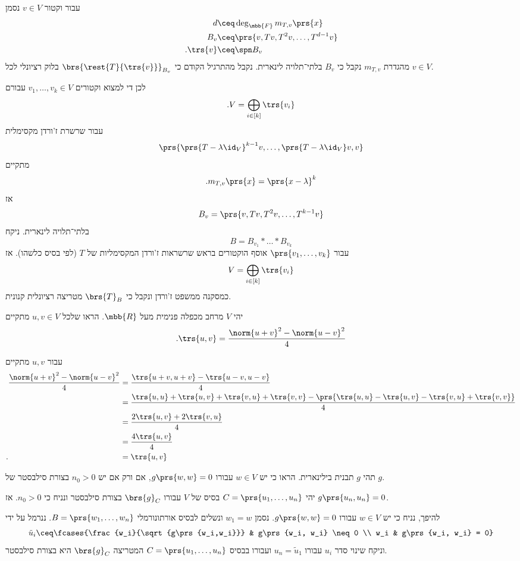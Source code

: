 \documentclass[a4paper,10pt,oneside,openany]{article}
\begin{document}
\begin{solution}
עבור וקטור
$v \in V$
נסמן
\begin{align*}
d &\ceq \deg_{\mbb{F}} m_{T,v}\prs{x} \\
B_v &\ceq \prs{v, Tv, T^2 v, \ldots, T^{d-1} v} \\
\text{.} \trs{v} &\ceq \spn B_v
\end{align*}
מהגדרת
$m_{T,v}$
נקבל כי
$B_v$
בלתי־תלויה לינארית.
נקבל מהתרגיל הקודם כי
$\brs{\rest{T}{\trs{v}}}_{B_v}$
בלוק רציונלי לכל
$v \in V$.

לכן די למצוא וקטורים
$v_1, \ldots, v_k \in V$
עבורם
\[\text{.} V = \bigoplus_{i \in [k]} \trs{v_i}\]
עבור שרשרת ז'ורדן מקסימלית
\[\prs{\prs{T-\lambda \id_V}^{k-1} v, \ldots, \prs{T-\lambda\id_V} v, v}\]
מתקיים
\[\text{.} m_{T,v}\prs{x} = \prs{x-\lambda}^k\]
אז
\[B_v = \prs{v, Tv, T^2v, \ldots, T^{k-1} v}\]
בלתי־תלויה לינארית.
ניקח
\[B = B_{v_1} * \ldots * B_{v_k}\]
עבור
$\prs{v_1, \ldots, v_k}$
אוסף הוקטורים בראש שרשראות ז'ורדן המקסימליות של
$T$
(לפי בסיס כלשהו).
אז
\[V = \bigoplus_{i \in [k]} \trs{v_i}\]
כמסקנה ממשפט ז'ורדן ונקבל כי
$\brs{T}_B$
מטריצה רציונלית קנונית.
\end{solution}

\begin{exercise}
יהי
$V$
מרחב מכפלה פנימית מעל
$\mbb{R}$.
הראו שלכל
$u,v \in V$
מתקיים
\[\text{.} \trs{u,v} = \frac{\norm{u+v}^2 - \norm{u-v}^2}{4}\]
\end{exercise}

\begin{solution}
עבור
$u,v$
מתקיים
\begin{align*}
\frac{\norm{u+v}^2 - \norm{u-v}^2}{4}
&=
\frac{\trs{u+v,u+v} - \trs{u-v,u-v}}{4}
\\&=
\frac{\trs{u,u}+\trs{u,v}+\trs{v,u}+\trs{v,v} - \prs{\trs{u,u} - \trs{u,v} - \trs{v,u} + \trs{v,v}}}{4}
\\&=
\frac{2\trs{u,v} + 2 \trs{v,u}}{4}
\\&= \frac{4 \trs{u,v}}{4}
\\ \text{.} \hphantom{\frac{\norm{u+v}^2 - \norm{u-v}^2}{4}} &= \trs{u,v}
\end{align*}
\end{solution}

\begin{exercise}
תהי
$g$
תבנית בילינארית.
הראו כי יש
$w \in V$
עבורו
$g\prs{w,w} = 0$,
 אם ורק אם יש
$n_0 > 0$
בצורת סילבסטר של
$g$.
\end{exercise}

\begin{solution}
יהי
$C = \prs{u_1, \ldots, u_n}$
בסיס של
$V$
עבורו
$\brs{g}_C$
בצורת סילבסטר ונניח כי
$n_0 > 0$.
אז
$g\prs{u_n, u_n} = 0$.

להיפך, נניח כי יש
$w \in V$
עבורו
$g\prs{w,w} = 0$.
נסמן
$w_1 = w$
ונשלים לבסיס אורתונורמלי
$B = \prs{w_1, \ldots, w_n}$.
ננרמל על ידי
\[\tilde{u}_i \ceq \fcases{\frac{w_i}{\sqrt{g\prs{w_i,w_i}}} & g\prs{w_i, w_i} \neq 0 \\ w_i & g\prs{w_i, w_i} = 0}\]
וניקח שינוי סדר
$u_i$
עבורו
$u_n = \tilde{u}_1$
ועבורו בבסיס
$C = \prs{u_1, \ldots, u_n}$
המטריצה
$\brs{g}_C$
היא בצורת סילבסטר.
\end{solution}
\end{document}
